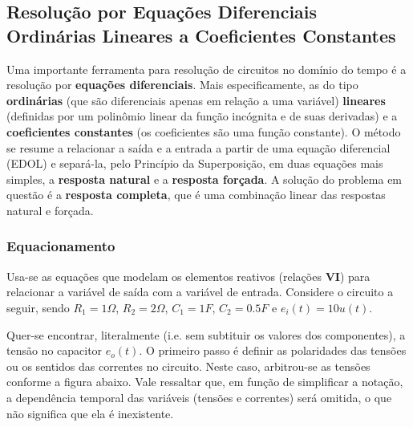 \documentclass{article}
\numberwithin{equation}{section}
\begin{document}
\subsection{Resolução por Equações Diferenciais Ordinárias Lineares a Coeficientes Constantes}
\label{subsec:edolcc}
Uma importante ferramenta para resolução de circuitos no domínio do tempo é a resolução por \textbf{equações diferenciais}. Mais especificamente, as do tipo \textbf{ordinárias} (que são diferenciais apenas em relação a uma variável) \textbf{lineares} (definidas por um polinômio linear da função incógnita e de suas derivadas) e a \textbf{coeficientes constantes} (os coeficientes são uma função constante). O método se resume a relacionar a saída e a entrada a partir de uma equação diferencial (EDOL) e separá-la, pelo Princípio da Superposição, em duas equações mais simples, a \textbf{resposta natural} e a \textbf{resposta forçada}. A solução do problema em questão é a \textbf{resposta completa}, que é uma combinação linear das respostas natural e forçada.

\subsubsection{Equacionamento}
\label{subsubsec:equacionamento}
Usa-se as equações que modelam os elementos reativos (relações \textbf{VI}) para relacionar a variável de saída com a variável de entrada. Considere o circuito a seguir, sendo $R_1=1\Omega$, $R_2=2\Omega$, $C_1=1F$, $C_2=0.5F$ e $e_i(t) = 10u(t)$.

\begin{center}
\end{center}

\noindent Quer-se encontrar, literalmente (i.e. sem subtituir os valores dos componentes), a tensão no capacitor $e_o(t)$. O primeiro passo é definir as polaridades das tensões ou os sentidos das correntes no circuito. Neste caso, arbitrou-se as tensões conforme a figura abaixo. Vale ressaltar que, em função de simplificar a notação, a dependência temporal das variáveis (tensões e correntes) será omitida, o que não significa que ela é inexistente.

\begin{center}
\end{center}
\end{document}
